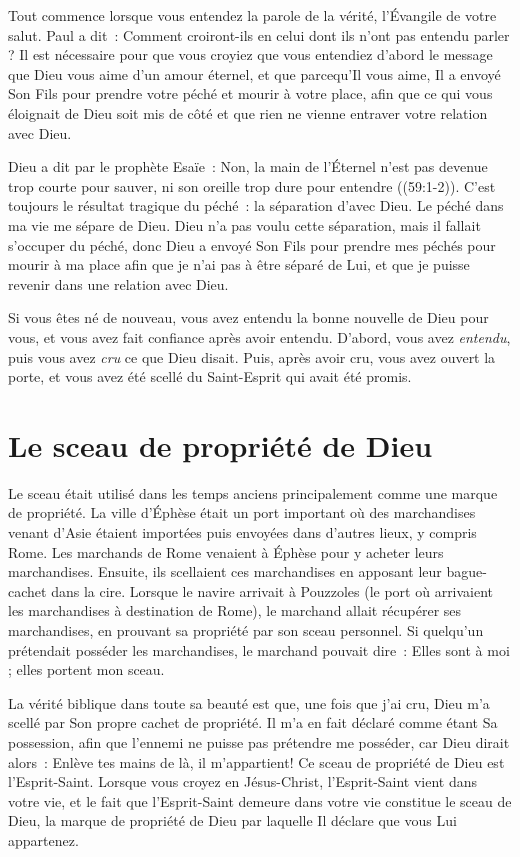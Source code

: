 Tout commence lorsque vous entendez \og la parole de la vérité,
 l'Évangile de votre salut. \fg{} Paul a dit~:
 \og Comment croiront-ils en celui dont ils n'ont pas entendu parler ? \fg{}
 Il est nécessaire pour que vous croyiez que vous entendiez d'abord le message
 que Dieu vous aime d'un amour éternel, et que parcequ'Il vous aime,
 Il a envoyé Son Fils pour prendre votre péché et mourir à votre place,
 afin que ce qui vous éloignait de Dieu soit mis de côté et que rien
 ne vienne entraver votre relation avec Dieu.

Dieu a dit par le prophète Esaïe~:
 \og Non, la main de l'Éternel n'est pas devenue trop courte pour sauver,
 ni son oreille trop dure pour entendre \fg{} ((59:1-2)).
 C'est toujours le résultat tragique du péché~: la séparation d'avec Dieu.
 Le péché dans ma vie me sépare de Dieu.
 Dieu n'a pas voulu cette séparation, mais il fallait s'occuper du péché,
 donc Dieu a envoyé Son Fils pour prendre mes péchés
 \ocadr pour mourir à ma place \ocadr afin que je n'ai pas
 à être séparé de Lui, et que je puisse revenir
 dans une relation avec Dieu.

Si vous êtes né de nouveau, vous avez entendu
 la bonne nouvelle de Dieu pour vous, et vous avez fait confiance
 après avoir entendu. D'abord, vous avez \emph{entendu},
 puis vous avez \emph{cru} ce que Dieu disait.
 Puis, après avoir cru, vous avez ouvert la porte,
 et vous avez été \og scellé du Saint-Esprit qui avait été promis. \fg{}


\section*{Le sceau de propriété de Dieu}

Le sceau était utilisé dans les temps anciens principalement
 comme une marque de propriété.
 La ville d'Éphèse était un port important où des marchandises
 venant d'Asie étaient importées puis envoyées dans d'autres lieux,
 y compris Rome.
 Les marchands de Rome venaient à Éphèse pour y acheter leurs marchandises.
 Ensuite, ils scellaient ces marchandises en apposant leur bague-cachet
 dans la cire.
 Lorsque le navire arrivait à Pouzzoles
 (le port où arrivaient les marchandises à destination de Rome),
 le marchand allait récupérer ses marchandises,
 en prouvant sa propriété par son sceau personnel.
 Si quelqu'un prétendait posséder les marchandises,
 le marchand pouvait dire~:
 \og Elles sont à moi ; elles portent mon sceau. \fg{}

La vérité biblique dans toute sa beauté est que, une fois que j'ai cru,
 Dieu m'a scellé par Son propre cachet de propriété.
 Il m'a en fait déclaré comme étant Sa possession, afin que l'ennemi
 ne puisse pas prétendre me posséder, car Dieu dirait alors~:
 \og  Enlève tes mains de là, il m'appartient! \fg{}
 Ce sceau de propriété de Dieu est l'Esprit-Saint.
 Lorsque vous croyez en Jésus-Christ, l'Esprit-Saint vient dans votre vie,
 et le fait que l'Esprit-Saint demeure dans votre vie
 constitue le sceau de Dieu, la marque de propriété de Dieu
 par laquelle Il déclare que vous Lui appartenez.


